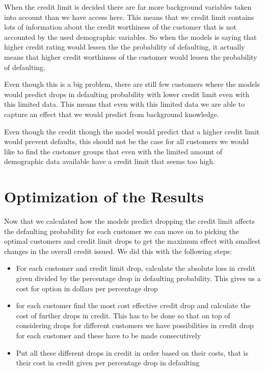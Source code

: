 \documentclass[12pt,a4paper,leqno]{report}
\theoremstyle{plain}
\theoremstyle{definition}
\theoremstyle{remark}
\begin{document}
When the credit limit is decided there are far more background variables taken into
account than we have access here. This means that we credit limit contains
lots of information about the credit worthiness of the customer that is not accounted
by the used demographic variables. So when the models is saying that higher
credit rating would lessen the the probability of defaulting, it actually means
that higher credit worthiness of the customer would lessen the probability of
defaulting.

Even though this is a big problem, there are still few customers where the models
would predict drops in defaulting probability with lower credit limit even with this
limited data. This means that even with this limited data we are able to capture
an effect that we would predict from background knowledge.


Even though the credit though the model would predict that a higher credit
limit would prevent defaults, this should not be the case for all customers
we would like to find the customer groups that even with the limited amount
of demographic data available have a credit limit that seems too high.

\section{Optimization of the Results}

Now that we calculated how the models predict dropping the credit limit affects the
defaulting probability for each customer we can move on to picking the optimal
customers and credit limit drops to get the maximum effect with smallest changes in
the overall credit issued. We did this with the following steps:

\begin{itemize}
    \item For each customer and credit limit drop, calculate the absolute loss
    in credit given divided by the percentage drop in defaulting probability. This
    gives us a cost for option in dollars per percentage drop
    \item for each customer find the most cost effective credit drop and calculate
    the cost of further drops in credit. This has to be done so that on top of
    considering drops for different customers we have possibilities in credit
    drop for each customer and these have to be made consecutively
    \item Put all these different drops in credit in order based on their costs, that
    is their cost in credit given per percentage drop in defaulting
\end{itemize}
\end{document}
